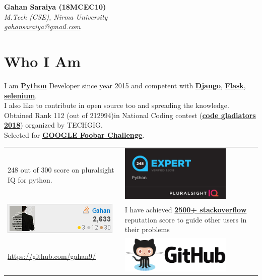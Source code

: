 \documentclass[a4paper, 14pt]{article}
\begin{document}
	\begin{flushright}
		{\large \hfill \textbf{Gahan Saraiya (18MCEC10)}} \\
		\textit{
			M.Tech (CSE), Nirma University \\
			\url{gahansaraiya@gmail.com}
		}
	\end{flushright}	
	\section*{Who I Am}
	I am \href{https://www.python.org/}{\textbf{Python}} Developer since year 2015 and competent with \href{https://www.djangoproject.com/}{\textbf{Django}}, \href{http://flask.pocoo.org/}{\textbf{Flask}}, \href{https://selenium-python.readthedocs.io/}{\textbf{selenium}}.
	\\ I also like to contribute in open source too and spreading the knowledge.
	\\ Obtained Rank 112 (out of 212994)in	National Coding contest (\href{https://www.techgig.com/codegladiators}{\textbf{code gladiators 2018}}) organized by TECHGIG.
	\\ Selected for \href{https://medium.com/magentacodes/things-you-should-know-about-google-foobar-invitation-703a535bf30f}{\textbf{GOOGLE Foobar Challenge}}.
	\begin{table}[H]
		\centering
		\begin{tabular}{ L L }
			248 out of 300 score on pluralsight IQ for python. 
			& 
			{\includegraphics[width=200px]{assets/pyIQ248.png}}
		\\ 
			\href{https://stackoverflow.com/users/flair/7664524.png}{\includegraphics{assets/so7664524.png}}
			& 
			I have achieved \href{https://stackoverflow.com/users/story/7664524}{\textbf{2500+ stackoverflow}}	reputation score to guide other users in their problems
		\\ 
			\url{https://github.com/gahan9/}
			& 
			\href{https://github.com/gahan9/}{\includegraphics[width=200px]{assets/github-logo.png}}
		\end{tabular}
	\end{table}
	
\end{document}

